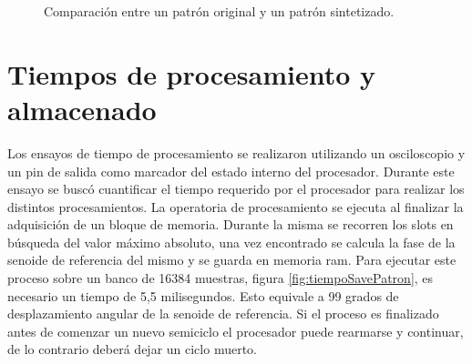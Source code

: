 \begin{figure}[htp] 
    \centering
    \hfill%
    \caption{Comparación entre un patrón original y un patrón sintetizado.}
\end{figure}


\section{Tiempos de procesamiento y almacenado}
Los ensayos de tiempo de procesamiento se realizaron utilizando un osciloscopio y un pin de salida como marcador del estado interno del procesador.
Durante este ensayo se buscó cuantificar el tiempo requerido por el procesador para realizar los distintos procesamientos. 
La operatoria de procesamiento se ejecuta al finalizar la adquisición de un bloque de memoria. Durante la misma se recorren los slots en búsqueda del valor máximo absoluto, una vez encontrado se calcula la fase de la senoide de referencia del mismo y se guarda en memoria ram. Para ejecutar este proceso sobre un banco de 16384 muestras, figura \ref{fig:tiempoSavePatron}, es necesario un tiempo de 5,5 milisegundos. Esto equivale a 99 grados de desplazamiento angular de la senoide de referencia. Si el proceso es finalizado antes de comenzar un nuevo semiciclo el procesador puede rearmarse y continuar, de lo contrario deberá dejar un ciclo muerto.

